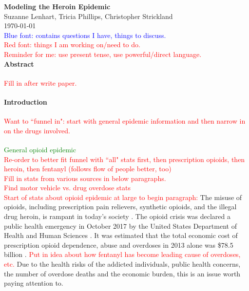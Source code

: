 \documentclass[12pt]{article}
\begin{document}
\textbf{\large{Modeling the Heroin Epidemic}} \\
Suzanne Lenhart, Tricia Phillips, Christopher Strickland \\
\today \\

\textcolor{blue}{Blue font: contains questions I have, things to discuss.} \\
\textcolor{red}{Red font: things I am working on/need to do.} \\ 
\textcolor{red}{Reminder for me: use present tense, use powerful/direct language.} \\
\textbf{Abstract} \\ \\
\textcolor{red}{Fill in after write paper.} \\ \\
\textbf{Introduction} \\ \\
\textcolor{red}{Want to ``funnel in": start with general epidemic information and then narrow in on the drugs involved.}\\ \\
\textcolor{green}{General opioid epidemic} \\
\textcolor{red}{Re-order to better fit funnel with ``all" stats first, then prescription opioids, then heroin, then fentanyl (follows flow of people better, too)} \\
\textcolor{red}{Fill in stats from various sources in below paragraphs.} \\
\textcolor{red}{Find motor vehicle vs. drug overdose stats} \\



\textcolor{red}{Start of stats about opioid epidemic at large to begin paragraph:} The misuse of opioids, including prescription pain relievers, synthetic opioids, and the illegal drug heroin, is rampant in today's society \cite{NIH2}. The opioid crisis was declared a public health emergency in October 2017 by the United States Department of Health and Human Sciences \cite{HHS1}. It was estimated that the total economic cost of prescription opioid dependence, abuse and overdoses in 2013 alone was \$78.5 billion \cite{Florence}. \textcolor{red}{Put in idea about how fentanyl has become leading cause of overdoses, etc.} Due to the health risks of the addicted individuals, public health concerns, the number of overdose deaths and the economic burden, this is an issue worth paying attention to.
\end{document}
